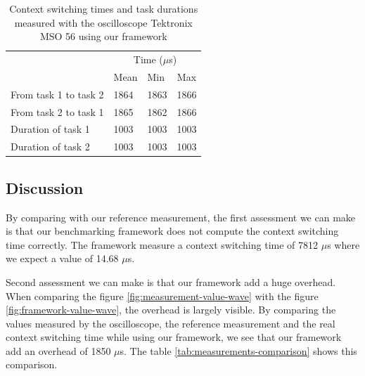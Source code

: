 \begin{table}[!ht]
  \centering
  \begin{tabular}{llll}
                        & \multicolumn{3}{c}{Time ($\mu$s)}                             \\ \cline{2-4} 
                        & \multicolumn{1}{c}{Mean} & Min  & \multicolumn{1}{c}{Max} \\ \cline{2-4} 
  From task 1 to task 2 & 1864                     & 1863 & 1866                    \\
  From task 2 to task 1 & 1865                     & 1862 & 1866                    \\
  Duration of task 1    & 1003                     & 1003 & 1003                    \\
  Duration of task 2    & 1003                     & 1003 & 1003                   
  \end{tabular}
  \caption{Context switching times and task durations measured with the oscilloscope Tektronix MSO 56 using our framework}
  \label{tab:oscilloscope-framework-measurement}
\end{table}

\subsection{Discussion}

By comparing with our reference measurement, the first assessment we can make is that our benchmarking framework does not compute the context switching time correctly.
The framework measure a context switching time of 7812 $\mu$s where we expect a value of 14.68 $\mu$s.

Second assessment we can make is that our framework add a huge overhead.
When comparing the figure \ref{fig:measurement-value-wave} with the figure \ref{fig:framework-value-wave}, the overhead is largely visible.
By comparing the values measured by the oscilloscope, the reference measurement and the real context switching time while using our framework, we see that our framework add an overhead of 1850 $\mu$s.
The table \ref{tab:measurements-comparison} shows this comparison.

